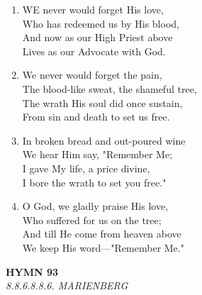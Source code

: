 \begin{enumerate}
    \item WE never would forget His love, \\
        Who has redeemed us by His blood, \\
        And now as our High Priest above \\
        Lives as our Advocate with God.

    \item We never would forget the pain, \\
        The blood-like sweat, the shameful tree, \\
        The wrath His soul did once sustain, \\
        From sin and death to set us free.

    \item In broken bread and out-poured wine \\
        We hear Him say, "Remember Me; \\
        I gave My life, a price divine, \\
        I bore the wrath to set you free."

    \item O God, we gladly praise His love, \\
        Who suffered for us on the tree; \\
        And till He come from heaven above \\
        We keep His word---"Remember Me."

\end{enumerate}

\newpage
\begin{center}
    {\Large \textbf{HYMN 93\textdagger{}}}
    \\
    \textit{8.8.6.8.8.6. MARIENBERG}
\end{center}
\vspace{1em}

